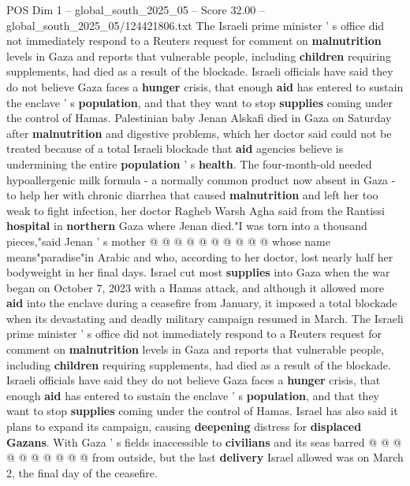 \begin{textsample}{POS Dim 1 – global\_south\_2025\_05 – Score 32.00 – global\_south\_2025\_05/124421806.txt}  \label{ex:f1_pos_064}
The Israeli prime minister ' s office did not immediately respond to a Reuters request for comment on \textbf{malnutrition} levels in Gaza and reports that vulnerable people, including \textbf{children} requiring supplements, had died as a result of the blockade.
Israeli officials have said they do not believe Gaza faces a \textbf{hunger} crisis, that enough \textbf{aid} has entered to sustain the enclave ' s \textbf{population}, and that they want to stop \textbf{supplies} coming under the control of Hamas.
Palestinian baby Jenan Alskafi died in Gaza on Saturday after \textbf{malnutrition} and digestive problems, which her doctor said could not be treated because of a total Israeli blockade that \textbf{aid} agencies believe is undermining the entire \textbf{population} ' s \textbf{health}.
The four-month-old needed hypoallergenic milk formula - a normally common product now absent in Gaza - to help her with chronic diarrhea that caused \textbf{malnutrition} and left her too weak to fight infection, her doctor Ragheb Warsh Agha said from the Rantissi \textbf{hospital} in \textbf{northern} Gaza where Jenan died."I was torn into a thousand pieces,"said Jenan ' s mother @ @ @ @ @ @ @ @ @ @ whose name means"paradise"in Arabic and who, according to her doctor, lost nearly half her bodyweight in her final days.
Israel cut most \textbf{supplies} into Gaza when the war began on October 7, 2023 with a Hamas attack, and although it allowed more \textbf{aid} into the enclave during a ceasefire from January, it imposed a total blockade when its devastating and deadly military campaign resumed in March.
The Israeli prime minister ' s office did not immediately respond to a Reuters request for comment on \textbf{malnutrition} levels in Gaza and reports that vulnerable people, including \textbf{children} requiring supplements, had died as a result of the blockade.
Israeli officials have said they do not believe Gaza faces a \textbf{hunger} crisis, that enough \textbf{aid} has entered to sustain the enclave ' s \textbf{population}, and that they want to stop \textbf{supplies} coming under the control of Hamas.
Israel has also said it plans to expand its campaign, causing \textbf{deepening} distress for \textbf{displaced} \textbf{Gazans}.
With Gaza ' s fields inaccessible to \textbf{civilians} and its seas barred @ @ @ @ @ @ @ @ @ @ from outside, but the last \textbf{delivery} Israel allowed was on March 2, the final day of the ceasefire.

\end{textsample}
